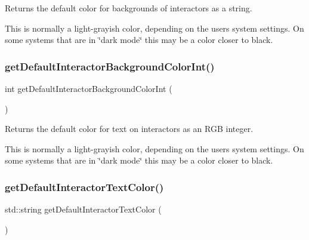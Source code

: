 Returns the default color for backgrounds of interactors as a string. 

This is normally a light-\/grayish color, depending on the user\textquotesingle{}s system settings. On some systems that are in \char`\"{}dark mode\char`\"{} this may be a color closer to black. \mbox{\label{classsgl_1_1GWindow_a04e520567df471df236f1efeb5ea4d90}} 
\subsubsection{\texorpdfstring{get\+Default\+Interactor\+Background\+Color\+Int()}{getDefaultInteractorBackgroundColorInt()}}
{\footnotesize\ttfamily int get\+Default\+Interactor\+Background\+Color\+Int (\begin{DoxyParamCaption}{ }\end{DoxyParamCaption})\hspace{0.3cm}{\ttfamily [static]}}



Returns the default color for text on interactors as an R\+GB integer. 

This is normally a light-\/grayish color, depending on the user\textquotesingle{}s system settings. On some systems that are in \char`\"{}dark mode\char`\"{} this may be a color closer to black. \mbox{\label{classsgl_1_1GWindow_aa65fc0c6ac0c5ebeafffe99e35face97}} 
\subsubsection{\texorpdfstring{get\+Default\+Interactor\+Text\+Color()}{getDefaultInteractorTextColor()}}
{\footnotesize\ttfamily std\+::string get\+Default\+Interactor\+Text\+Color (\begin{DoxyParamCaption}{ }\end{DoxyParamCaption})\hspace{0.3cm}{\ttfamily [static]}}



